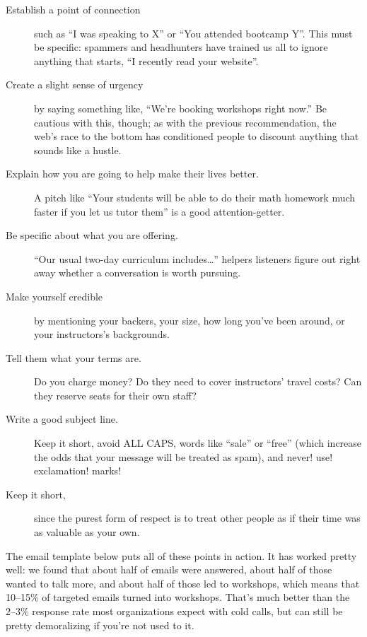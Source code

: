 \begin{description}

\item[Establish a point of connection] such as ``I was speaking to X''
  or ``You attended bootcamp Y''. This must be specific: spammers and
  headhunters have trained us all to ignore anything that starts, ``I
  recently read your website''.

\item[Create a slight sense of urgency] by saying something like,
  ``We're booking workshops right now.''  Be cautious with this,
  though; as with the previous recommendation, the web's race to the
  bottom has conditioned people to discount anything that sounds like
  a hustle.

\item[Explain how you are going to help make their lives better.]  A
  pitch like ``Your students will be able to do their math homework
  much faster if you let us tutor them'' is a good attention-getter.

\item[Be specific about what you are offering.] ``Our usual two-day
  curriculum includes{\ldots}'' helpers listeners figure out right
  away whether a conversation is worth pursuing.

\item[Make yourself credible] by mentioning your backers, your size,
  how long you've been around, or your instructors's backgrounds.

\item[Tell them what your terms are.]  Do you charge money? Do they
  need to cover instructors' travel costs?  Can they reserve seats for
  their own staff?

\item[Write a good subject line.]  Keep it short, avoid ALL CAPS,
  words like ``sale'' or ``free'' (which increase the odds that your
  message will be treated as spam), and never! use! exclamation!
  marks!

\item[Keep it short,] since the purest form of respect is to treat
  other people as if their time was as valuable as your own.

\end{description}

The email template below puts all of these points in action.  It has
worked pretty well: we found that about half of emails were answered,
about half of those wanted to talk more, and about half of those led
to workshops, which means that 10--15\% of targeted emails turned into
workshops.  That's much better than the 2--3\% response rate most
organizations expect with cold calls, but can still be pretty
demoralizing if you're not used to it.

